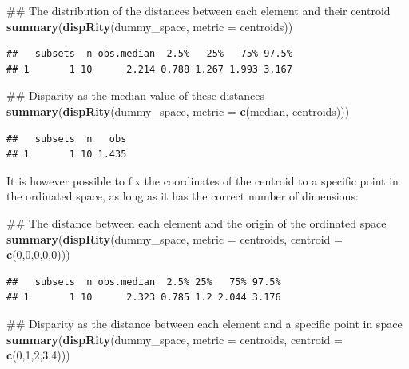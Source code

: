 \documentclass[]{book}
\newenvironment{Shaded}{\begin{snugshade}}{\end{snugshade}}
\newcommand{\KeywordTok}[1]{\textcolor[rgb]{0.13,0.29,0.53}{\textbf{#1}}}
\newcommand{\DataTypeTok}[1]{\textcolor[rgb]{0.13,0.29,0.53}{#1}}
\newcommand{\DecValTok}[1]{\textcolor[rgb]{0.00,0.00,0.81}{#1}}
\newcommand{\NormalTok}[1]{#1}
\theoremstyle{definition}
\theoremstyle{definition}
\theoremstyle{definition}
\theoremstyle{remark}
\begin{document}
\begin{Shaded}
\begin{Highlighting}[]
\NormalTok{## The distribution of the distances between each element and their centroid}
\KeywordTok{summary}\NormalTok{(}\KeywordTok{dispRity}\NormalTok{(dummy_space, }\DataTypeTok{metric =}\NormalTok{ centroids))}
\end{Highlighting}
\end{Shaded}

\begin{verbatim}
##   subsets  n obs.median  2.5%   25%   75% 97.5%
## 1       1 10      2.214 0.788 1.267 1.993 3.167
\end{verbatim}

\begin{Shaded}
\begin{Highlighting}[]
\NormalTok{## Disparity as the median value of these distances}
\KeywordTok{summary}\NormalTok{(}\KeywordTok{dispRity}\NormalTok{(dummy_space, }\DataTypeTok{metric =} \KeywordTok{c}\NormalTok{(median, centroids)))}
\end{Highlighting}
\end{Shaded}

\begin{verbatim}
##   subsets  n   obs
## 1       1 10 1.435
\end{verbatim}

It is however possible to fix the coordinates of the centroid to a
specific point in the ordinated space, as long as it has the correct
number of dimensions:

\begin{Shaded}
\begin{Highlighting}[]
\NormalTok{## The distance between each element and the origin of the ordinated space}
\KeywordTok{summary}\NormalTok{(}\KeywordTok{dispRity}\NormalTok{(dummy_space, }\DataTypeTok{metric =}\NormalTok{ centroids, }\DataTypeTok{centroid =} \KeywordTok{c}\NormalTok{(}\DecValTok{0}\NormalTok{,}\DecValTok{0}\NormalTok{,}\DecValTok{0}\NormalTok{,}\DecValTok{0}\NormalTok{,}\DecValTok{0}\NormalTok{)))}
\end{Highlighting}
\end{Shaded}

\begin{verbatim}
##   subsets  n obs.median  2.5% 25%   75% 97.5%
## 1       1 10      2.323 0.785 1.2 2.044 3.176
\end{verbatim}

\begin{Shaded}
\begin{Highlighting}[]
\NormalTok{## Disparity as the distance between each element and a specific point in space}
\KeywordTok{summary}\NormalTok{(}\KeywordTok{dispRity}\NormalTok{(dummy_space, }\DataTypeTok{metric =}\NormalTok{ centroids, }\DataTypeTok{centroid =} \KeywordTok{c}\NormalTok{(}\DecValTok{0}\NormalTok{,}\DecValTok{1}\NormalTok{,}\DecValTok{2}\NormalTok{,}\DecValTok{3}\NormalTok{,}\DecValTok{4}\NormalTok{)))}
\end{Highlighting}
\end{Shaded}
\end{document}
